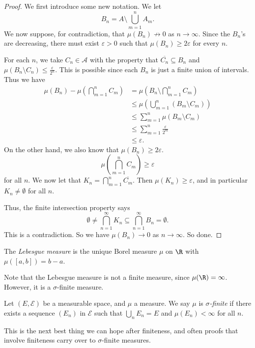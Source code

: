\documentclass[a4paper]{article}
\begin{document}
\begin{proof}
  We first introduce some new notation. We let
  \[
    B_n = A \setminus \bigcup_{m = 1}^n A_m.
  \]
  We now suppose, for contradiction, that $\mu(B_n) \not\to 0$ as $n \to \infty$. Since the $B_n$'s are decreasing, there must exist $\varepsilon > 0$ such that $\mu(B_n) \geq 2 \varepsilon$ for every $n$.

  For each $n$, we take $C_n \in \mathcal{A}$ with the property that $\overline{C_n} \subseteq B_n$ and $\mu(B_n \setminus C_n) \leq \frac{\varepsilon}{2^n}$. This is possible since each $B_n$ is just a finite union of intervals. Thus we have
  \begin{align*}
    \mu(B_n) - \mu\left(\bigcap_{m = 1}^n C_m\right) &= \mu\left(B_n \setminus \bigcap_{m = 1}^n C_m\right) \\
    &\leq \mu\left(\bigcup_{m = 1}^n (B_m \setminus C_m)\right) \\
    &\leq \sum_{m = 1}^n \mu(B_m \setminus C_m) \\
    &\leq \sum_{m = 1}^n \frac{\varepsilon}{2^m} \\
    &\leq \varepsilon.
  \end{align*}
  On the other hand, we also know that $\mu(B_n) \geq 2\varepsilon$.
  \[
    \mu\left(\bigcap_{m = 1}^n C_m\right) \geq \varepsilon
  \]
  for all $n$. We now let that $K_n = \bigcap_{m = 1}^n \overline{C_m}$. Then $\mu(K_n) \geq \varepsilon$, and in particular $K_n \not= \emptyset$ for all $n$.

  Thus, the finite intersection property says
  \[
    \emptyset \not= \bigcap_{n = 1}^\infty K_n \subseteq \bigcap_{n = 1}^\infty B_n = \emptyset.
  \]
  This is a contradiction. So we have $\mu(B_n) \to 0$ as $n \to \infty$. So done.
\end{proof}

\begin{defi}
  The \emph{Lebesgue measure} is the unique Borel measure $\mu$ on $\R$ with $\mu([a, b]) = b - a$.
\end{defi}

Note that the Lebesgue measure is not a finite measure, since $\mu(\R) = \infty$. However, it is a $\sigma$-finite measure.
\begin{defi}
  Let $(E, \mathcal{E})$ be a measurable space, and $\mu$ a measure. We say $\mu$ is \emph{$\sigma$-finite} if there exists a sequence $(E_n)$ in $\mathcal{E}$ such that $\bigcup_n E_n = E$ and $\mu(E_n) < \infty$ for all $n$.
\end{defi}
This is the next best thing we can hope after finiteness, and often proofs that involve finiteness carry over to $\sigma$-finite measures.
\end{document}
